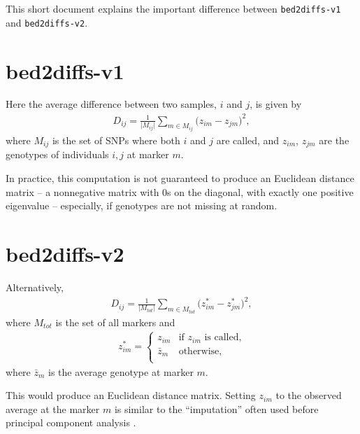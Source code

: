 \documentclass[draft,a4paper,10pt,DIV=15,titlepage,mpinclude=true]{scrartcl}
\newcommand{\keystring}[1]{{\tt #1}}
\begin{document}
This short document explains the important difference between \keystring{bed2diffs-v1} and \keystring{bed2diffs-v2}.

\section{bed2diffs-v1}

Here the average difference between two samples, $i$ and $j$, is given by
\begin{align}
D_{ij} = \frac{1}{\big|M_{ij}\big|}\sum_{m\in M_{ij}}\big(z_{im} - z_{jm}\big)^2,
\end{align}
where $M_{ij}$ is the set of SNPs where both $i$ and $j$ are called, and $z_{im}$, $z_{jm}$ are the genotypes of individuals $i,j$ at marker $m$.

In practice, this computation is not guaranteed to produce an Euclidean distance matrix -- a nonnegative matrix with 0s on the diagonal, with exactly one positive eigenvalue \cite{Gower:1982fk} -- especially, if genotypes are not missing at random.

\section{bed2diffs-v2}
Alternatively,
\begin{align}
D_{ij} = \frac{1}{\big|M_{tot}\big|}\sum_{m\in M_{tot}}\big(z^*_{im} - z^*_{jm}\big)^2,
\end{align}
where $M_{tot}$ is the set of all markers and
\begin{align}
z^*_{im} = \begin{cases}
z_{im} & \text{if $z_{im}$ is called,}\\
\bar{z}_m & \text{otherwise,} \\
\end{cases}
\end{align}
where $\bar{z}_m$ is the average genotype at marker $m$.

This would produce an Euclidean distance matrix. Setting $z_{im}$ to the observed average at the marker $m$ is similar to the ``imputation'' often used before principal component analysis \cite{Price:2006kx}.



\end{document}
